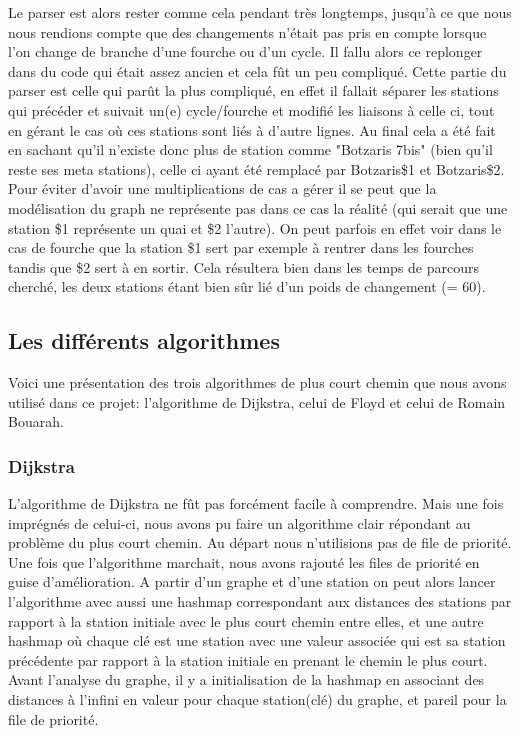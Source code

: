 \documentclass[french, 12pt]{article}
\begin{document}
Le parser est alors rester comme cela pendant très longtemps, jusqu'à ce que nous nous rendions compte que des changements n'était pas pris en compte lorsque l'on change de branche d'une fourche ou d'un cycle. Il fallu alors ce replonger dans du code qui était assez ancien et cela fût un peu compliqué. Cette partie du parser est celle qui parût la plus compliqué, en effet il fallait séparer les stations qui précéder et suivait un(e) cycle/fourche et modifié les liaisons à celle ci, tout en gérant le cas où ces stations sont liés à d'autre lignes. Au final cela a été fait en sachant qu'il n'existe donc plus de station comme "Botzaris 7bis" (bien qu'il reste ses meta stations), celle ci ayant été remplacé par Botzaris\$1 et Botzaris\$2. Pour éviter d'avoir une multiplications de cas a gérer il se peut que la modélisation du graph ne représente pas dans ce cas la réalité (qui serait que une station \$1 représente un quai et \$2 l'autre). On peut parfois en effet voir dans le cas de fourche que la station \$1 sert par exemple à rentrer dans les fourches tandis que \$2 sert à en sortir. Cela résultera bien dans les temps de parcours cherché, les deux stations étant bien sûr lié d'un poids de changement (= 60).

\subsection{Les différents algorithmes}
Voici une présentation des trois algorithmes de plus court chemin que nous avons utilisé dans ce projet: l'algorithme de Dijkstra, celui de Floyd et celui de Romain Bouarah.
\subsubsection{Dijkstra}
L'algorithme de Dijkstra ne fût pas forcément facile à comprendre. Mais une fois imprégnés de celui-ci, nous avons pu faire un algorithme clair répondant au problème du plus court chemin. Au départ nous n'utilisions pas de file de priorité.
Une fois que l'algorithme marchait, nous avons rajouté les files de priorité en guise d'amélioration.
A partir d'un graphe et d'une station on peut alors lancer l'algorithme avec aussi une hashmap correspondant aux distances des stations par rapport à la station initiale avec le plus court chemin entre elles, et une autre hashmap où chaque clé est une station avec une valeur associée qui est sa station précédente par rapport à la station initiale en prenant le chemin le plus court.
Avant l'analyse du graphe, il y a initialisation de la hashmap en associant des distances à l'infini en valeur pour chaque station(clé) du graphe, et pareil pour la file de priorité.
\end{document}
